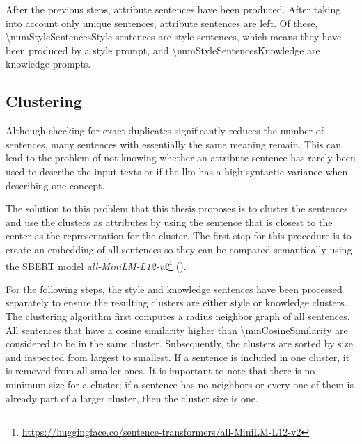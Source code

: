 After the previous steps, \numStyleSentencesNotUniqueText{} attribute sentences have been produced. After taking into account only unique sentences, \numStyleSentencesText{} attribute sentences are left. Of these, \num{\numStyleSentencesStyle} sentences are style sentences, which means they have been produced by a style prompt, and \num{\numStyleSentencesKnowledge} are knowledge prompts.

%   

\subsection{Clustering}
\label{sec:experiments:setup:clustering}
Although checking for exact duplicates significantly reduces the number of sentences, many sentences with essentially the same meaning remain. This can lead to the problem of not knowing whether an attribute sentence has rarely been used to describe the input texts or if the \ac{llm} has a high syntactic variance when describing one concept.

The solution to this problem that this thesis proposes is to cluster the sentences and use the clusters as attributes by using the sentence that is closest to the center as the representation for the cluster.
The first step for this procedure is to create an embedding of all sentences so they can be compared semantically using the SBERT model \textit{all-MiniLM-L12-v2}\footnote{\url{https://huggingface.co/sentence-transformers/all-MiniLM-L12-v2}} (\cite{reimersSentenceBERTSentenceEmbeddings2019}).

For the following steps, the style and knowledge sentences have been processed separately to ensure the resulting clusters are either style or knowledge clusters.
The clustering algorithm first computes a radius neighbor graph of all sentences. All sentences that have a cosine similarity higher than \num{\minCosineSimilarity} are considered to be in the same cluster. Subsequently, the clusters are sorted by size and inspected from largest to smallest. If a sentence is included in one cluster, it is removed from all smaller ones. It is important to note that there is no minimum size for a cluster; if a sentence has no neighbors or every one of them is already part of a larger cluster, then the cluster size is one.

